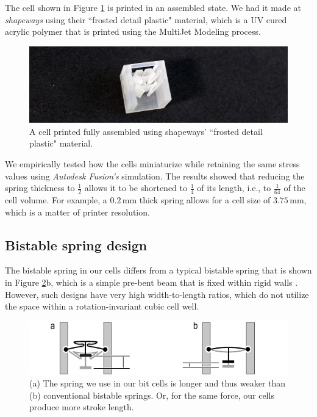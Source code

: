 The cell shown in Figure \ref{fig:22-cell-printed-assembled} is printed in an assembled state. We had it made at \textit{shapeways} using their ``frosted detail plastic" material, which is a UV cured acrylic polymer that is printed using the MultiJet Modeling process. 

\begin{figure} [h]  
    \includegraphics[width=\textwidth]{chapters/digital-metamaterials-FIG/22-cell-printed-assembled.jpg}
    \caption[Short figure name.]{A cell printed fully assembled using shapeways' ``frosted detail plastic" material. 
    \label{fig:22-cell-printed-assembled}}
\end{figure}

We empirically tested how the cells miniaturize while retaining the same stress values using \textit{Autodesk Fusion's} simulation. The results showed that reducing the spring thickness to \(\frac{1}{2}\) allows it to be shortened to \(\frac{1}{4}\) of its length, i.e., to \(\frac{1}{64}\) of the cell volume. For example, a $0.2\, \mathrm{mm}$ thick spring allows for a cell size of $3.75\, \mathrm{mm}$, which is a matter of printer resolution.


\subsection{Bistable spring design}

The bistable spring in our cells differs from a typical bistable spring that is shown in Figure \ref{fig:23-springs-simple-vs-ours}b, which is a simple pre-bent beam that is fixed within rigid walls \cite{Qiu2004}. However, such designs have very high width-to-length ratios, which do not utilize the space within a rotation-invariant cubic cell well.

\begin{figure} [h]  
    \includegraphics[width=\textwidth]{chapters/digital-metamaterials-FIG/23-springs-simple-vs-ours.pdf}
    \caption[Short figure name.]{(a) The spring we use in our bit cells is longer and thus weaker than (b) conventional bistable springs. Or, for the same force, our cells produce more stroke length.
    \label{fig:23-springs-simple-vs-ours}}
\end{figure}

